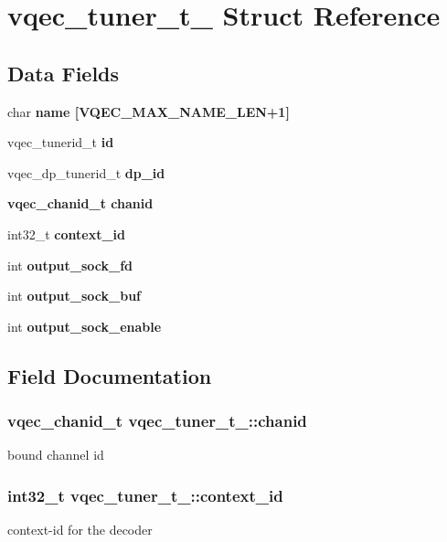\section{vqec\_\-tuner\_\-t\_\- Struct Reference}
\label{structvqec__tuner__t__}
\subsection*{Data Fields}
\begin{CompactItemize}
\item 
char \bf{name} [VQEC\_\-MAX\_\-NAME\_\-LEN+1]
\item 
vqec\_\-tunerid\_\-t \bf{id}
\item 
vqec\_\-dp\_\-tunerid\_\-t \bf{dp\_\-id}
\item 
\bf{vqec\_\-chanid\_\-t} \bf{chanid}
\item 
int32\_\-t \bf{context\_\-id}
\item 
int \bf{output\_\-sock\_\-fd}
\item 
int \bf{output\_\-sock\_\-buf}
\item 
int \bf{output\_\-sock\_\-enable}
\end{CompactItemize}


\subsection{Field Documentation}
\subsubsection{\setlength{\rightskip}{0pt plus 5cm}\bf{vqec\_\-chanid\_\-t} \bf{vqec\_\-tuner\_\-t\_\-::chanid}}\label{structvqec__tuner__t___1aec81d741de2d0f5c1d1fc8459c2a66}


bound channel id 
\subsubsection{\setlength{\rightskip}{0pt plus 5cm}int32\_\-t \bf{vqec\_\-tuner\_\-t\_\-::context\_\-id}}\label{structvqec__tuner__t___c2ec1479d6624a5df89187164d820112}


context-id for the decoder 
